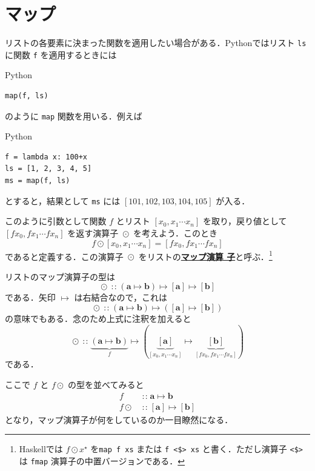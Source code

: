 \documentclass[a5paper,twoside,fleqn,draft]{jsbook}
\newcommand{\programminglanguage}[1]{\textsf{#1}}
\newcommand{\haskell}{\programminglanguage{Haskell}}
\newcommand{\python}{\programminglanguage{Python}}
\newcommand{\keyword}[1]{{\underline{\textbf{#1}}}}
\newcommand{\code}[1]{\texttt{#1}}
\newenvironment{pythoncode}{\begin{itembox}[r]{\python}}{\end{itembox}}
\DeclareMathOperator{\mIn}{{:\!:}}
\DeclareMathOperator{\mMapList}{\odot}
\DeclareMathOperator{\mMapsTo}{\mapsto}
\newcommand{\mType}[1]{\mathbf{#1}} %
\newcommand{\mA}{\mType{a}}
\newcommand{\mB}{\mType{b}}
\newcommand{\mList}[1]{{#1}^\mathrm{\star}}
\begin{document}
\section{マップ}

リストの各要素に決まった関数を適用したい場合がある．\python ではリスト
\code{ls} に関数 \code{f} を適用するときには
\begin{pythoncode}
\begin{verbatim}
map(f, ls)
\end{verbatim}
\end{pythoncode}
のように \code{map} 関数を用いる．例えば
\begin{pythoncode}
\begin{verbatim}
f = lambda x: 100+x
ls = [1, 2, 3, 4, 5]
ms = map(f, ls)
\end{verbatim}
\end{pythoncode}
とすると，結果として \code{ms} には $[101,102,103,104,105]$
が入る．

このように引数として関数 $f$ とリスト $[x_0,x_1\dotsb x_n]$
を取り，戻り値として $[fx_0,fx_1\dotsb fx_n]$ を返す演算子
$\mMapList$ を考えよう．このとき
\begin{equation}
  f\mMapList[x_0,x_1\dotsb x_n]
  =[fx_0,fx_1\dotsb fx_n]
\end{equation}
であると定義する．この演算子 $\mMapList$ をリストの\keyword{マップ演算
  子}と呼ぶ．\footnote{\haskell では $f\mMapList\mList{x}$ を\code{map
    f xs} または \code{f <\$> xs} と書く．ただし演算子 \code{<\$>} は
  \code{fmap} 演算子の中置バージョンである．}

リストのマップ演算子の型は
\begin{equation}
  \mMapList
  \mIn{}(\mA\mMapsTo\mB)\mMapsTo[\mA]\mMapsTo[\mB]
\end{equation}
である．矢印 $\mMapsTo$ は右結合なので，これは
\begin{equation}
  \mMapList
  \mIn{}(\mA\mMapsTo\mB)\mMapsTo([\mA]\mMapsTo[\mB])
\end{equation}
の意味でもある．念のため上式に注釈を加えると
\begin{equation}
  \mMapList
  \mIn\underbrace{\left(\mA\mMapsTo\mB\right)}_f
  \mMapsTo\left(\underbrace{[\mA]}_{[x_0,x_1\dotsb x_n]}
  \mMapsTo\underbrace{[\mB]}_{[fx_0,fx_1\dotsb fx_n]}\right)
\end{equation}
である．

ここで $f$ と $f\mMapList$ の型を並べてみると
\begin{align}
  f
  &\mIn\mA\mMapsTo\mB\\
  f\mMapList
  &\mIn{}[\mA]\mMapsTo[\mB]
\end{align}
となり，マップ演算子が何をしているのか一目瞭然になる．
\end{document}
